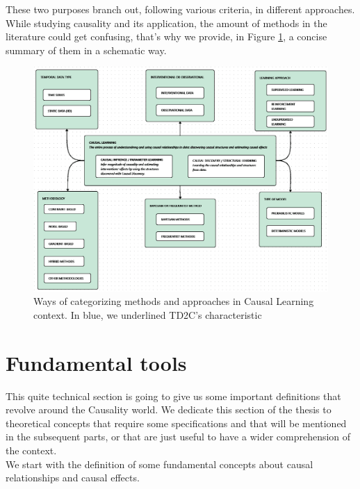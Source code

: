 These two purposes branch out, following various criteria, in different approaches. While studying causality and its application, the amount of methods in the literature could get confusing, that's why we provide, in Figure \ref{fig:1}, a concise summary of them in a schematic way.  

\begin{figure}[!h]
    \centering
    \includegraphics[width=1\linewidth]{chapters//Images/Causal Learning scheme.png}
    \caption{Ways of categorizing methods and approaches in Causal Learning context. In blue, we underlined TD2C's characteristic}
    \label{fig:1}
\end{figure}

\section{Fundamental tools}
This quite technical section is going to give us some important definitions that revolve around the Causality world. We dedicate this section of the thesis to theoretical concepts that require some specifications and that will be mentioned in the subsequent parts, or that are just useful to have a wider comprehension of the context.\\

We start with the definition of some fundamental concepts about causal relationships and causal effects.\\


